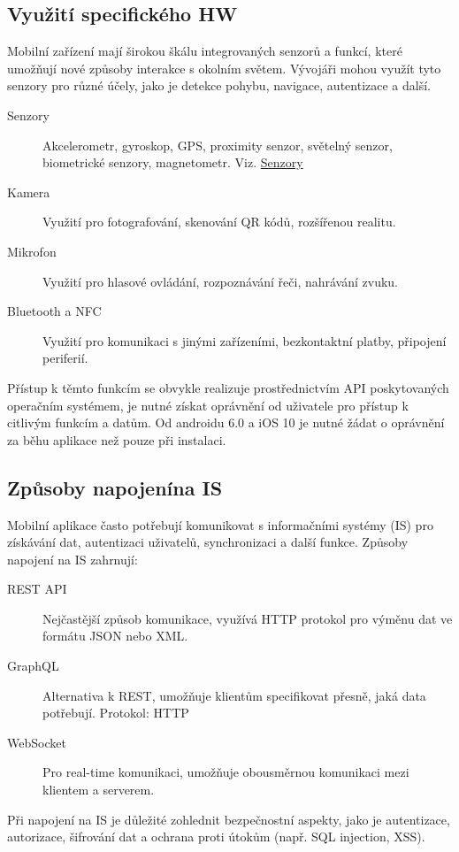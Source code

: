 \subsection{Využití specifického HW} 
\label{sub:vsHW}
Mobilní zařízení mají širokou škálu integrovaných senzorů a funkcí, které umožňují 
nové způsoby interakce s okolním světem. Vývojáři mohou využít tyto senzory pro různé 
účely, jako je detekce pohybu, navigace, autentizace a další.

\begin{description}
    \item[Senzory] Akcelerometr, gyroskop, GPS, proximity senzor, světelný senzor, 
    biometrické senzory, magnetometr. Viz. \hyperref[des:senzory]{Senzory}
    \item[Kamera] Využití pro fotografování, skenování QR kódů, rozšířenou realitu.
    \item[Mikrofon] Využití pro hlasové ovládání, rozpoznávání řeči, nahrávání zvuku.
    \item[Bluetooth a NFC] Využití pro komunikaci s jinými zařízeními, 
    bezkontaktní platby, připojení periferií.
\end{description}
Přístup k těmto funkcím se obvykle realizuje prostřednictvím API poskytovaných 
operačním systémem, je nutné získat oprávnění od uživatele pro přístup k citlivým 
funkcím a datům. Od androidu 6.0 a iOS 10 je nutné žádat o oprávnění za běhu 
aplikace než pouze při instalaci.

\subsection{Způsoby napojenína IS}
Mobilní aplikace často potřebují komunikovat s informačními systémy (IS) pro získávání 
dat, autentizaci uživatelů, synchronizaci a další funkce. Způsoby napojení na 
IS zahrnují:
\begin{description}
    \item[REST API] Nejčastější způsob komunikace, využívá HTTP protokol pro 
    výměnu dat ve formátu JSON nebo XML.
    \item[GraphQL] Alternativa k REST, umožňuje klientům specifikovat přesně, jaká data 
    potřebují. Protokol: HTTP
    \item[WebSocket] Pro real-time komunikaci, umožňuje obousměrnou komunikaci mezi 
    klientem a serverem.
\end{description}
Při napojení na IS je důležité zohlednit bezpečnostní aspekty, jako je autentizace, 
autorizace, šifrování dat a ochrana proti útokům (např. SQL injection, XSS).

